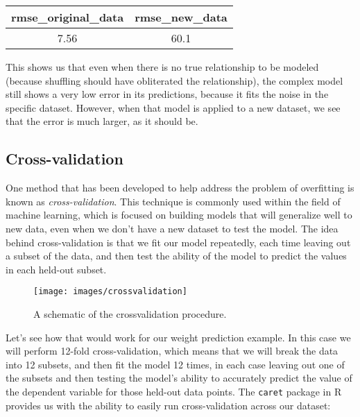 \documentclass[]{book}
\theoremstyle{definition}
\theoremstyle{definition}
\theoremstyle{definition}
\theoremstyle{remark}
\begin{document}
\begin{longtable}[]{@{}cc@{}}
\toprule
\begin{minipage}[b]{0.27\columnwidth}\centering\strut
rmse\_original\_data\strut
\end{minipage} & \begin{minipage}[b]{0.20\columnwidth}\centering\strut
rmse\_new\_data\strut
\end{minipage}\tabularnewline
\midrule
\endhead
\begin{minipage}[t]{0.27\columnwidth}\centering\strut
7.56\strut
\end{minipage} & \begin{minipage}[t]{0.20\columnwidth}\centering\strut
60.1\strut
\end{minipage}\tabularnewline
\bottomrule
\end{longtable}

This shows us that even when there is no true relationship to be modeled
(because shuffling should have obliterated the relationship), the
complex model still shows a very low error in its predictions, because
it fits the noise in the specific dataset. However, when that model is
applied to a new dataset, we see that the error is much larger, as it
should be.

\subsection{Cross-validation}\label{cross-validation}

One method that has been developed to help address the problem of
overfitting is known as \emph{cross-validation}. This technique is
commonly used within the field of machine learning, which is focused on
building models that will generalize well to new data, even when we
don't have a new dataset to test the model. The idea behind
cross-validation is that we fit our model repeatedly, each time leaving
out a subset of the data, and then test the ability of the model to
predict the values in each held-out subset.

\begin{figure}
\texttt{[image: images/crossvalidation]} \caption{A schematic of the  crossvalidation procedure.}\label{fig:crossvalidation}
\end{figure}

Let's see how that would work for our weight prediction example. In this
case we will perform 12-fold cross-validation, which means that we will
break the data into 12 subsets, and then fit the model 12 times, in each
case leaving out one of the subsets and then testing the model's ability
to accurately predict the value of the dependent variable for those
held-out data points. The \texttt{caret} package in R provides us with
the ability to easily run cross-validation across our dataset:
\end{document}
